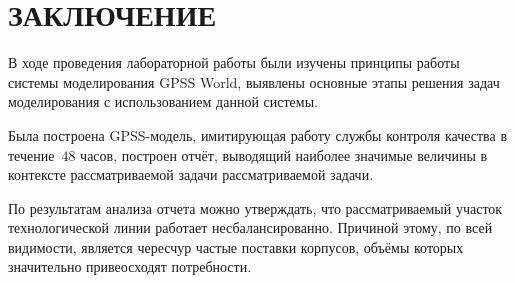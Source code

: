 \section*{ЗАКЛЮЧЕНИЕ}

В ходе проведения лабораторной работы были изучены принципы работы системы моделирования
GPSS World, выявлены основные этапы  решения задач моделирования с использованием данной системы.

Была построена GPSS-модель, имитирующая работу службы контроля качества в течение~$48$ часов,
построен отчёт, выводящий наиболее значимые величины в контексте рассматриваемой задачи рассматриваемой задачи.

По результатам анализа отчета можно утверждать, что рассматриваемый 
участок технологической линии работает несбалансированно. 
Причиной этому, по всей видимости, является чересчур частые поставки 
корпусов, объёмы которых значительно привеосходят потребности.


\newpage
